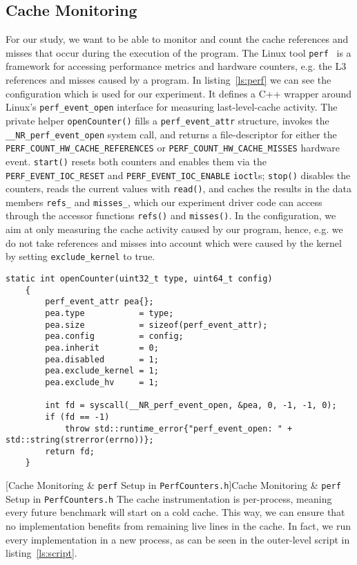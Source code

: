 \documentclass{article}
\begin{document}
\subsection{Cache Monitoring}
For our study, we want to be able to monitor and count the cache references and misses that occur during the execution of the program. The Linux tool \texttt{perf}~\cite{perfwiki2025} is a framework for accessing performance metrics and hardware counters, e.g. the L3 references and misses caused by a program. In listing~\ref{ls:perf} we can see the configuration which is used for our experiment. It defines a C++ wrapper around Linux’s \texttt{perf\_event\_open} interface for measuring last-level-cache activity. The private helper \texttt{openCounter()} fills a \texttt{perf\_event\_attr} structure, invokes the \texttt{\_\_NR\_perf\_event\_open} system call, and returns a file-descriptor for either the \texttt{PERF\_COUNT\_HW\_CACHE\_REFERENCES} or \texttt{PERF\_COUNT\_HW\_CACHE\_MISSES} hardware event. \texttt{start()} resets both counters and enables them via the \texttt{PERF\_EVENT\_IOC\_RESET} and \texttt{PERF\_EVENT\_IOC\_ENABLE} \texttt{ioctl}s; \texttt{stop()} disables the counters, reads the current values with \texttt{read()}, and caches the results in the data members \texttt{refs\_} and \texttt{misses\_}, which our experiment driver code can access through the accessor functions \texttt{refs()} and \texttt{misses()}. In the configuration, we aim at only measuring the cache activity caused by our program, hence, e.g. we do not take references and misses into account which were caused by the kernel by setting \texttt{exclude\_kernel} to true.
\begin{lstlisting}
static int openCounter(uint32_t type, uint64_t config)
    {
        perf_event_attr pea{};
        pea.type           = type;
        pea.size           = sizeof(perf_event_attr);
        pea.config         = config;
        pea.inherit        = 0;       
        pea.disabled       = 1;
        pea.exclude_kernel = 1;
        pea.exclude_hv     = 1;

        int fd = syscall(__NR_perf_event_open, &pea, 0, -1, -1, 0);
        if (fd == -1)
            throw std::runtime_error{"perf_event_open: " + std::string(strerror(errno))};
        return fd;
    }
\end{lstlisting}
[Cache Monitoring \& \texttt{perf} Setup in \texttt{PerfCounters.h}]{Cache Monitoring \& \texttt{perf} Setup in \texttt{PerfCounters.h}}
\label{ls:perf}
The cache instrumentation is per-process, meaning every future benchmark will start on a cold cache. This way, we can ensure that no implementation benefits from remaining live lines in the cache. In fact, we run every implementation in a new process, as can be seen in the outer-level script in listing~\ref{ls:script}.
\end{document}
